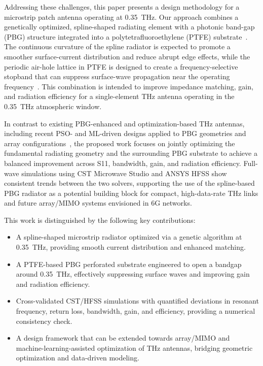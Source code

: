 \documentclass[a4paper,fleqn]{cas-dc}
\begin{document}
Addressing these challenges, this paper presents a design methodology for a microstrip patch antenna operating at 0.35~THz. Our approach combines a genetically optimized, spline-shaped radiating element with a photonic band-gap (PBG) structure integrated into a polytetrafluoroethylene (PTFE) substrate~\cite{john_spline_monopole_2007,khezzar_pbg_2021}. The continuous curvature of the spline radiator is expected to promote a smoother surface-current distribution and reduce abrupt edge effects, while the periodic air-hole lattice in PTFE is designed to create a frequency-selective stopband that can suppress surface-wave propagation near the operating frequency~\cite{temmar_bspo_2019,kushwaha_photonic_2018}. This combination is intended to improve impedance matching, gain, and radiation efficiency for a single-element THz antenna operating in the 0.35~THz atmospheric window.

In contrast to existing PBG-enhanced and optimization-based THz antennas, including recent PSO- and ML-driven designs applied to PBG geometries and array configurations~\cite{babaahmed_hybrid_2025,li_triband_2024,panda_fractal_2025}, the proposed work focuses on jointly optimizing the fundamental radiating geometry and the surrounding PBG substrate to achieve a balanced improvement across S11, bandwidth, gain, and radiation efficiency. Full-wave simulations using CST Microwave Studio and ANSYS HFSS show consistent trends between the two solvers, supporting the use of the spline-based PBG radiator as a potential building block for compact, high-data-rate THz links and future array/MIMO systems envisioned in 6G networks.

This work is distinguished by the following key contributions:
\begin{itemize}
    \item A spline-shaped microstrip radiator optimized via a genetic algorithm at 0.35~THz, providing smooth current distribution and enhanced matching.
    \item A PTFE-based PBG perforated substrate engineered to open a bandgap around 0.35~THz, effectively suppressing surface waves and improving gain and radiation efficiency.
    \item Cross-validated CST/HFSS simulations with quantified deviations in resonant frequency, return loss, bandwidth, gain, and efficiency, providing a numerical consistency check.
    \item A design framework that can be extended towards array/MIMO and machine-learning-assisted optimization of THz antennas, bridging geometric optimization and data-driven modeling.
\end{itemize}
\end{document}
